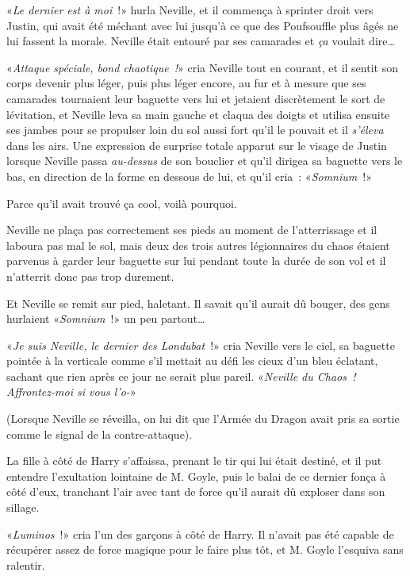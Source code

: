 «\emph{Le dernier est à moi}~!» hurla Neville, et il commença à sprinter droit vers Justin, qui avait été méchant avec lui jusqu'à ce que des Poufsouffle plus âgés ne lui fassent la morale. Neville était entouré par ses camarades et \emph{ça} voulait dire…

«\emph{Attaque spéciale, bond chaotique~!}» cria Neville tout en courant, et il sentit son corps devenir plus léger, puis plus léger encore, au fur et à mesure que ses camarades tournaient leur baguette vers lui et jetaient discrètement le sort de lévitation, et Neville leva sa main gauche et claqua des doigts et utilisa ensuite ses jambes pour se propulser loin du sol aussi fort qu'il le pouvait et il \emph{s'éleva} dans les airs. Une expression de surprise totale apparut sur le visage de Justin lorsque Neville passa \emph{au-dessus} de son bouclier et qu'il dirigea sa baguette vers le bas, en direction de la forme en dessous de lui, et qu'il cria~: «\emph{Somnium}~!»

Parce qu'il avait trouvé ça cool, voilà pourquoi.

Neville ne plaça pas correctement ses pieds au moment de l'atterrissage et il laboura pas mal le sol, mais deux des trois autres légionnaires du chaos étaient parvenus à garder leur baguette sur lui pendant toute la durée de son vol et il n'atterrit donc pas trop durement.

Et Neville se remit sur pied, haletant. Il savait qu'il aurait dû bouger, des gens hurlaient «\emph{Somnium}~!» un peu partout…

«\emph{Je suis Neville, le dernier des Londubat}~!» cria Neville vers le ciel, sa baguette pointée à la verticale comme s'il mettait au défi les cieux d'un bleu éclatant, sachant que rien après ce jour ne serait plus pareil. «\emph{Neville du Chaos~! Affrontez-moi si vous l'o-}»

(Lorsque Neville se réveilla, on lui dit que l'Armée du Dragon avait pris sa sortie comme le signal de la contre-attaque).

\later

La fille à côté de Harry s'affaissa, prenant le tir qui lui était destiné, et il put entendre l'exultation lointaine de M. Goyle, puis le balai de ce dernier fonça à côté d'eux, tranchant l'air avec tant de force qu'il aurait dû exploser dans son sillage.

«\emph{Luminos}~!» cria l'un des garçons à côté de Harry. Il n'avait pas été capable de récupérer assez de force magique pour le faire plus tôt, et M. Goyle l'esquiva sans ralentir.

